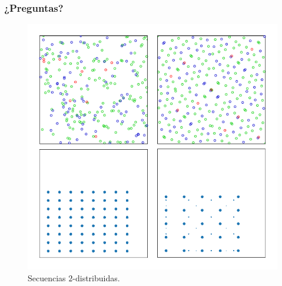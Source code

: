 \documentclass[t, 10pt, mathserif]{beamer}
\begin{document}
\begin{frame}
  \frametitle{¿Preguntas?}

  \vspace{-0.5cm}
  \begin{figure}
    \includegraphics[scale=0.3]{resources/ultima.png}
    \caption{Secuencias $2$-distribuidas.}
  \end{figure}
\end{frame}
 
\end{document}
